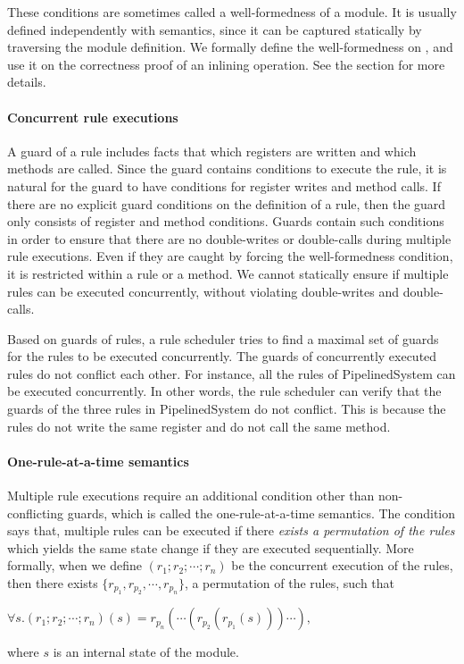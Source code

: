 These conditions are sometimes called a well-formedness of a
module. It is usually defined independently with semantics, since it
can be captured statically by traversing the module definition. We
formally define the well-formedness on , and use it on
the correctness proof of an inlining operation. See the section for
more details.

\paragraph{Concurrent rule executions}

A guard of a rule includes facts that which registers are written and
which methods are called. Since the guard contains conditions to
execute the rule, it is natural for the guard to have conditions for
register writes and method calls. If there are no explicit guard
conditions on the definition of a rule, then the guard only consists
of register and method conditions. Guards contain such conditions in
order to ensure that there are no double-writes or double-calls during
multiple rule executions. Even if they are caught by forcing the
well-formedness condition, it is restricted within a rule or a
method. We cannot statically ensure if multiple rules can be executed
concurrently, without violating double-writes and double-calls.

Based on guards of rules, a rule scheduler tries to find a maximal set
of guards for the rules to be executed concurrently. The guards of
concurrently executed rules do not conflict each other. For instance,
all the rules of PipelinedSystem can be executed concurrently. In
other words, the rule scheduler can verify that the guards of the
three rules in PipelinedSystem do not conflict. This is because the
rules do not write the same register and do not call the same method.

\paragraph{One-rule-at-a-time semantics}

Multiple rule executions require an additional condition other than
non-conflicting guards, which is called the one-rule-at-a-time
semantics. The condition says that, multiple rules can be executed if
there \emph{exists a permutation of the rules} which yields the same
state change if they are executed sequentially. More formally, when we
define $(r_1; r_2; \cdots; r_n)$ be the concurrent execution of the
rules, then there exists $\{r_{p_1}, r_{p_2}, \cdots, r_{p_n}\}$, a
permutation of the rules, such that
\begin{center}
  \begin{math}
    \forall s. (r_1; r_2; \cdots; r_n)(s) = r_{p_n}(\cdots(r_{p_2}(r_{p_1}(s)))\cdots),
  \end{math}
\end{center}
where $s$ is an internal state of the module.

